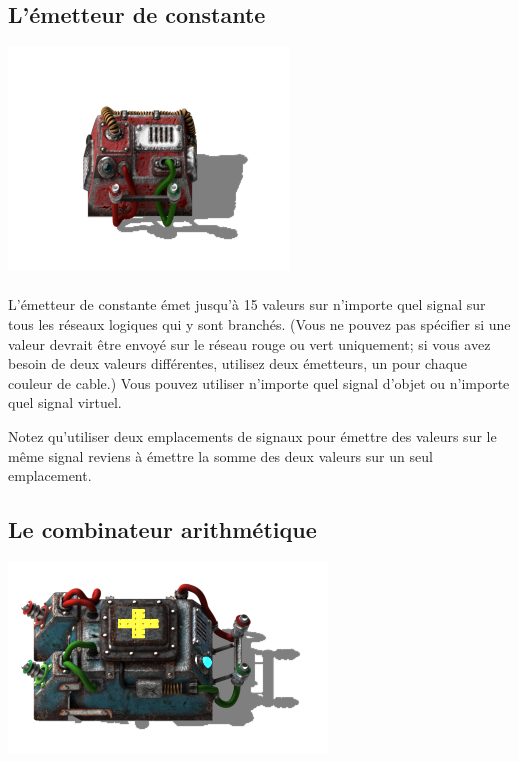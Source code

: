 \documentclass{scrreprt}
\begin{document}
    	\subsection{L'émetteur de constante}
    	\begin{minipage}[t]{\textwidth}
    		
    		
    		{
    			\centering
    			\includegraphics{pics/factorio-constant.png}
    		}
    		
    	\end{minipage}
    
	    \paragraph{}
	    L'émetteur de constante émet jusqu'à 15 valeurs sur n'importe quel signal sur tous les réseaux logiques qui y sont branchés. 
	    (Vous ne pouvez pas spécifier si une valeur devrait être envoyé sur le réseau rouge ou vert uniquement; si vous avez besoin de deux valeurs différentes, utilisez deux émetteurs, un pour chaque couleur de cable.) 
	    Vous pouvez utiliser n'importe quel signal d'objet ou n'importe quel signal virtuel.
	    
	    \begin{info}
	    	Notez qu'utiliser deux emplacements de signaux pour émettre des valeurs sur le même signal reviens à émettre la somme des deux valeurs sur un seul emplacement.
	    \end{info}
    
    \subsection{Le combinateur arithmétique}
    
    	\begin{minipage}[t]{\textwidth}
    		
    		{
    			\centering
    			\includegraphics{pics/factorio-arithmetic.png}
    		}
    		
    	
    	\end{minipage} 
    
\end{document}
